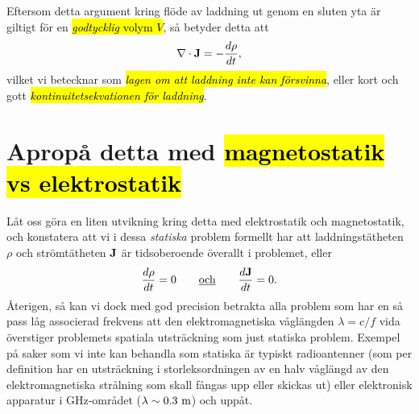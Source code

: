 Eftersom detta argument kring fl{\"o}de av laddning ut genom en sluten yta
{\"a}r giltigt f{\"o}r en {\hl{{\it godtycklig} volym $V$}}, s{\aa} betyder
detta att
\hl{$$
  \nabla\cdot{\bf J}=-{{d\rho}\over{dt}},
$$}
vilket vi betecknar
som {\hl{\it lagen om att laddning inte kan f{\"o}rsvinna}}, eller kort och
gott {\hl{\it kontinuitetsekvationen f{\"o}r laddning}}.

\section{Aprop{\aa} detta med {\hl{magnetostatik vs elektrostatik}}}
L{\aa}t oss g{\"o}ra en liten utvikning kring detta med elektrostatik och
magnetostatik, och konstatera att vi i dessa {\it statiska} problem formellt
har att laddningst{\"a}theten $\rho$ och str{\"o}mt{\"a}theten ${\bf J}$
{\"a}r tidsoberoende {\"o}verallt i problemet, eller
\hl{$$
  {{d\rho}\over{dt}}=0
  \qquad\underline{\hbox{och}}\qquad
  {{d{\bf J}}\over{dt}}=0.
$$}
{\AA}terigen, s{\aa} kan vi dock med god precision betrakta alla problem som
har en s{\aa} pass l{\aa}g associerad frekvens att den elektromagnetiska
v{\aa}gl{\"a}ngden $\lambda=c/f$ vida {\"o}verstiger problemets spatiala
utstr{\"a}ckning
som just statiska problem. Exempel p{\aa} saker som vi inte kan behandla som
statiska {\"a}r typiskt radioantenner (som per definition har en
utstr{\"a}ckning i storleksordningen av en halv v{\aa}gl{\"a}ngd av den
elektromagnetiska str{\aa}lning som skall f{\aa}ngas upp eller skickas ut)
eller elektronisk apparatur i GHz-omr{\aa}det ($\lambda\sim0.3\ {\rm m}$)
och upp{\aa}t.

